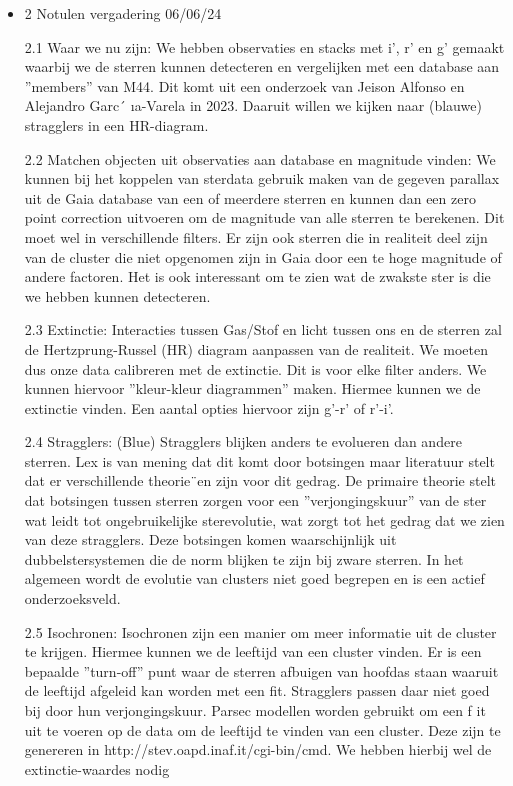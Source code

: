 \documentclass[11pt,a4paper]{article}
\begin{document}
\pagebreak
\begin{itemize}
    \item 
 2 Notulen vergadering 06/06/24 


2.1 Waar we nu zijn:
 We hebben observaties en stacks met i’, r’ en g’ gemaakt waarbij we de sterren kunnen
 detecteren en vergelijken met een database aan ”members” van M44. Dit komt uit een
 onderzoek van Jeison Alfonso en Alejandro Garc´ ıa-Varela in 2023. Daaruit willen we kijken
 naar (blauwe) stragglers in een HR-diagram.

 
 2.2 Matchen objecten uit observaties aan database en magnitude vinden:
 We kunnen bij het koppelen van sterdata gebruik maken van de gegeven parallax uit de Gaia
 database van een of meerdere sterren en kunnen dan een zero point correction uitvoeren om
 de magnitude van alle sterren te berekenen. Dit moet wel in verschillende filters. Er zijn ook
 sterren die in realiteit deel zijn van de cluster die niet opgenomen zijn in Gaia door een te
 hoge magnitude of andere factoren. Het is ook interessant om te zien wat de zwakste ster is
 die we hebben kunnen detecteren.

 
 2.3 Extinctie:
 Interacties tussen Gas/Stof en licht tussen ons en de sterren zal de Hertzprung-Russel (HR)
 diagram aanpassen van de realiteit. We moeten dus onze data calibreren met de extinctie.
 Dit is voor elke filter anders. We kunnen hiervoor ”kleur-kleur diagrammen” maken. Hiermee
 kunnen we de extinctie vinden. Een aantal opties hiervoor zijn g’-r’ of r’-i’.

 
 2.4 Stragglers:
 (Blue) Stragglers blijken anders te evolueren dan andere sterren. Lex is van mening dat dit
 komt door botsingen maar literatuur stelt dat er verschillende theorie¨en zijn voor dit gedrag.
 De primaire theorie stelt dat botsingen tussen sterren zorgen voor een ”verjongingskuur” van
 de ster wat leidt tot ongebruikelijke sterevolutie, wat zorgt tot het gedrag dat we zien van
 deze stragglers. Deze botsingen komen waarschijnlijk uit dubbelstersystemen die de norm
 blijken te zijn bij zware sterren. In het algemeen wordt de evolutie van clusters niet goed
 begrepen en is een actief onderzoeksveld.

 
 2.5 Isochronen:
 Isochronen zijn een manier om meer informatie uit de cluster te krijgen. Hiermee kunnen
 we de leeftijd van een cluster vinden. Er is een bepaalde ”turn-off” punt waar de sterren
 afbuigen van hoofdas staan waaruit de leeftijd afgeleid kan worden met een fit. Stragglers
 passen daar niet goed bij door hun verjongingskuur. Parsec modellen worden gebruikt om een
 f
 it uit te voeren op de data om de leeftijd te vinden van een cluster. Deze zijn te genereren
 in http://stev.oapd.inaf.it/cgi-bin/cmd. We hebben hierbij wel de extinctie-waardes
 nodig


\end{itemize}
\end{document}
